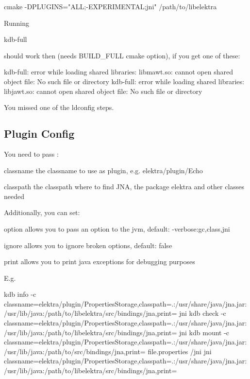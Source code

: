 \begin{DoxyCode}
cmake -DPLUGINS="ALL;-EXPERIMENTAL;jni" /path/to/libelektra
\end{DoxyCode}


Running


\begin{DoxyCode}
kdb-full
\end{DoxyCode}


should work then (needs B\+U\+I\+L\+D\+\_\+\+F\+U\+LL cmake option), if you get one of these\+:


\begin{DoxyCode}
kdb-full: error while loading shared libraries: libmawt.so: cannot open shared object file: No such file or
       directory
kdb-full: error while loading shared libraries: libjawt.so: cannot open shared object file: No such file or
       directory
\end{DoxyCode}


You missed one of the ldconfig steps.

\subsection*{Plugin Config}

You need to pass \+:


\begin{DoxyItemize}
\item classname the classname to use as plugin, e.\+g. {\ttfamily elektra/plugin/\+Echo}
\item classpath the classpath where to find J\+NA, the package elektra and other classes needed
\end{DoxyItemize}

Additionally, you can set\+:


\begin{DoxyItemize}
\item option allows you to pass an option to the jvm, default\+: {\ttfamily -\/verbose\+:gc,class,jni}
\item ignore allows you to ignore broken options, default\+: {\ttfamily false}
\item print allows you to print java exceptions for debugging purposes
\end{DoxyItemize}

E.\+g.


\begin{DoxyCode}
kdb info -c
       classname=elektra/plugin/PropertiesStorage,classpath=.:/usr/share/java/jna.jar:/usr/lib/java:/path/to/libelektra/src/bindings/jna,print= jni
kdb check -c
       classname=elektra/plugin/PropertiesStorage,classpath=.:/usr/share/java/jna.jar:/usr/lib/java:/path/to/libelektra/src/bindings/jna,print= jni
kdb mount -c
       classname=elektra/plugin/PropertiesStorage,classpath=.:/usr/share/java/jna.jar:/usr/lib/java:/path/to/src/bindings/jna,print= file.properties /jni jni
       classname=elektra/plugin/PropertiesStorage,classpath=.:/usr/share/java/jna.jar:/usr/lib/java:/path/to/libelektra/src/bindings/jna,print=
\end{DoxyCode}


